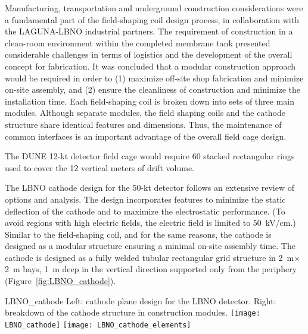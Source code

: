 Manufacturing, transportation and underground construction
considerations were a fundamental part of the field-shaping coil
design process, in collaboration with the LAGUNA-LBNO industrial
partners. The requirement of construction in a clean-room environment
within the completed membrane tank presented considerable challenges
in terms of logistics and the development of the overall concept for
fabrication.  It was concluded that a modular construction approach
would be required in order to (1) maximize off-site shop fabrication
and minimize on-site assembly, and (2) ensure the cleanliness of
construction and minimize the installation time. %
Each field-shaping coil is broken down %
 into sets of three main modules. 
Although separate modules, the field shaping coils and the cathode
structure share identical features and dimensions.  Thus, the
maintenance of common interfaces is an important advantage of the
overall field cage design.
 
The DUNE 12-kt detector field cage would require %
60 stacked rectangular rings
used to cover the 12 vertical meters of drift volume.

The LBNO cathode design for the 50-kt detector follows an extensive
review of options and analysis. The design incorporates features to
minimize the static deflection of the cathode and to maximize the
electrostatic performance. (To avoid regions with high electric
fields, the electric field is limited to 50~kV/cm.)  Similar to the
field-shaping coil, and for the same reasons, the cathode is designed
as a modular structure ensuring a minimal on-site assembly
time. The cathode is designed as a fully welded tubular rectangular
grid structure in 2~m$\times$2~m bays, 
 1~m deep in the vertical
direction supported only from the periphery
(Figure~\ref{fig:LBNO_cathode}).
\begin{cdrfigure}{LBNO_cathode}
{\small Left: cathode plane design for the LBNO detector. Right: breakdown of 
the cathode structure in construction modules.}
\texttt{[image: LBNO\_cathode]} \hfil
\texttt{[image: LBNO\_cathode\_elements]}
\end{cdrfigure}

